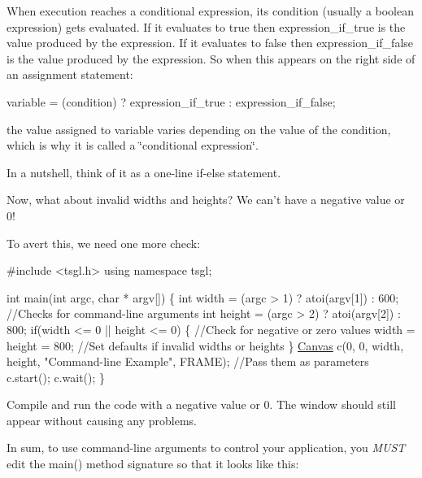 When execution reaches a conditional expression, its {\ttfamily condition} (usually a boolean expression) gets evaluated. If it evaluates to {\ttfamily true} then {\ttfamily expression\-\_\-if\-\_\-true} is the value produced by the expression. If it evaluates to {\ttfamily false} then {\ttfamily expression\-\_\-if\-\_\-false} is the value produced by the expression. So when this appears on the right side of an assignment statement\-:


\begin{DoxyCode}
variable = (condition) ? expression\_if\_true : expression\_if\_false;
\end{DoxyCode}


the value assigned to {\ttfamily variable} varies depending on the value of the {\ttfamily condition}, which is why it is called a \char`\"{}conditional expression\char`\"{}.

In a nutshell, think of it as a one-\/line if-\/else statement.

Now, what about invalid widths and heights? We can't have a negative value or 0!

To avert this, we need one more check\-:


\begin{DoxyCode}
\textcolor{preprocessor}{#include <tsgl.h>}
\textcolor{keyword}{using namespace }tsgl;

\textcolor{keywordtype}{int} main(\textcolor{keywordtype}{int} argc, \textcolor{keywordtype}{char} * argv[]) \{
  \textcolor{keywordtype}{int} width = (argc > 1) ? atoi(argv[1]) : 600;  \textcolor{comment}{//Checks for command-line arguments}
  \textcolor{keywordtype}{int} height = (argc > 2) ? atoi(argv[2]) : 800;
  \textcolor{keywordflow}{if}(width <= 0 || height <= 0) \{  \textcolor{comment}{//Check for negative or zero values}
    width = height = 800;  \textcolor{comment}{//Set defaults if invalid widths or heights}
  \}
  \hyperlink{classtsgl_1_1_canvas}{Canvas} c(0, 0, width, height, \textcolor{stringliteral}{"Command-line Example"}, FRAME);  \textcolor{comment}{//Pass them as parameters}
  c.start();
  c.wait();
\}
\end{DoxyCode}


Compile and run the code with a negative value or 0. The window should still appear without causing any problems.

In sum, to use command-\/line arguments to control your application, you {\itshape M\-U\-S\-T} edit the {\ttfamily main()} method signature so that it looks like this\-:


